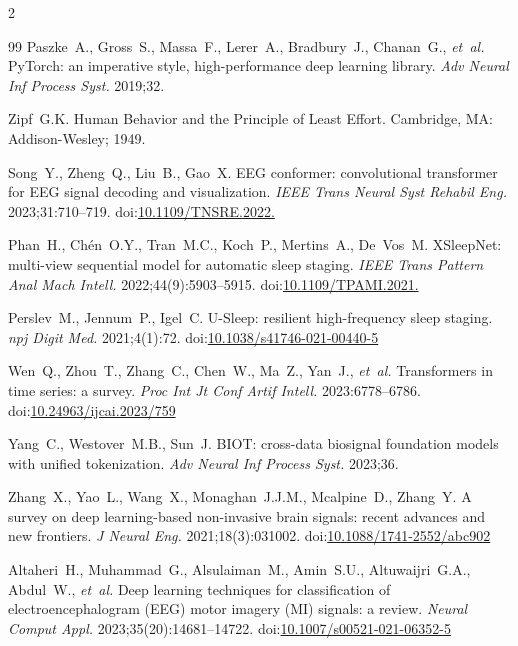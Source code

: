 \documentclass[14pt,a4paper]{extarticle}
\begin{document}
\begin{multicols}{2}
\begin{thebibliography}{99}
Paszke~A., Gross~S., Massa~F., Lerer~A., Bradbury~J., Chanan~G., \textit{et~al.}
PyTorch: an imperative style, high-performance deep learning library.
\textit{Adv Neural Inf Process Syst.} 2019;32.

Zipf~G.K.
Human Behavior and the Principle of Least Effort.
Cambridge, MA: Addison-Wesley; 1949.

Song~Y., Zheng~Q., Liu~B., Gao~X.
EEG conformer: convolutional transformer for EEG signal decoding and visualization.
\textit{IEEE Trans Neural Syst Rehabil Eng.} 2023;31:710--719.
doi:\href{https://doi.org/10.1109/TNSRE.2022.3230250}{10.1109/\allowbreak TNSRE.2022.}

Phan~H., Ch\'en~O.Y., Tran~M.C., Koch~P., Mertins~A., De~Vos~M.
XSleepNet: multi-view sequential model for automatic sleep staging.
\textit{IEEE Trans Pattern Anal Mach Intell.} 2022;44(9):5903--5915.
doi:\href{https://doi.org/10.1109/TPAMI.2021.3070057}{10.1109/\allowbreak TPAMI.2021.}

Perslev~M., Jennum~P., Igel~C.
U-Sleep: resilient high-frequency sleep staging.
\textit{npj Digit Med.} 2021;4(1):72.
doi:\href{https://doi.org/10.1038/s41746-021-00440-5}{10.1038/s41746-021-00440-5}

Wen~Q., Zhou~T., Zhang~C., Chen~W., Ma~Z., Yan~J., \textit{et~al.}
Transformers in time series: a survey.
\textit{Proc Int Jt Conf Artif Intell.} 2023:6778--6786.
doi:\href{https://doi.org/10.24963/ijcai.2023/759}{10.24963/ijcai.2023/759}

Yang~C., Westover~M.B., Sun~J.
BIOT: cross-data biosignal foundation models with unified tokenization.
\textit{Adv Neural Inf Process Syst.} 2023;36.

Zhang~X., Yao~L., Wang~X., Monaghan~J.J.M., Mcalpine~D., Zhang~Y.
A survey on deep learning-based non-invasive brain signals: recent advances and new frontiers.
\textit{J Neural Eng.} 2021;18(3):031002.
doi:\href{https://doi.org/10.1088/1741-2552/abc902}{10.1088/1741-2552/abc902}

Altaheri~H., Muhammad~G., Alsulaiman~M., Amin~S.U., Altuwaijri~G.A., Abdul~W.,
\textit{et~al.}
Deep learning techniques for classification of electroencephalogram (EEG) motor imagery
(MI) signals: a review.
\textit{Neural Comput Appl.} 2023;35(20):14681--14722.
doi:\href{https://doi.org/10.1007/s00521-021-06352-5}{10.1007/s00521-021-06352-5}


\end{thebibliography}
\end{multicols}
\end{document}
